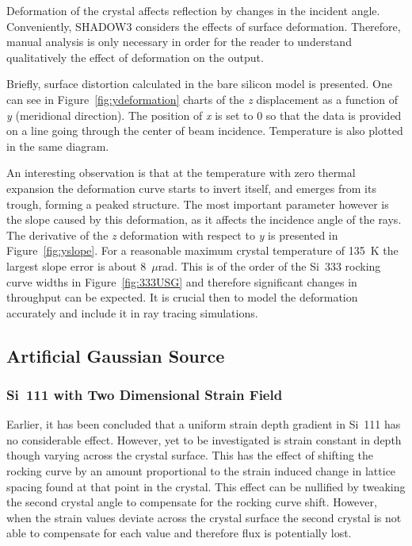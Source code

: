 \documentclass[preprint]{iucr}              %
\begin{document}
Deformation of the crystal affects reflection by changes in the incident angle. Conveniently, SHADOW3 considers the effects of surface deformation. Therefore, manual analysis is only necessary in order for the reader to understand qualitatively the effect of deformation on the output.

Briefly, surface distortion calculated in the bare silicon model is presented. One can see in Figure~\ref{fig:ydeformation} charts of the \textit{z} displacement as a function of \textit{y} (meridional direction). The position of \textit{x} is set to 0 so that the data is provided on a line going through the center of beam incidence. Temperature is also plotted in the same diagram.

An interesting observation is that at the temperature with zero thermal expansion the deformation curve starts to invert itself, and emerges from its trough, forming a peaked structure. The most important parameter however is the slope caused by this deformation, as it affects the incidence angle of the rays. The derivative of the \textit{z} deformation with respect to \textit{y} is presented in Figure~\ref{fig:yslope}. For a reasonable maximum crystal temperature of 135~K the largest slope error is about 8~$\mu$rad. This is of the order of the Si~333 rocking curve widths in Figure~\ref{fig:333USG} and therefore significant changes in throughput can be expected. It is crucial then to model the deformation accurately and include it in ray tracing simulations.

\subsection{Artificial Gaussian Source}\label{gaussian}
\subsubsection{Si~111 with Two Dimensional Strain Field}\label{111simulation}
Earlier, it has been concluded that a uniform strain depth gradient in Si~111 has no considerable effect. However, yet to be investigated is strain constant in depth though varying across the crystal surface. This has the effect of shifting the rocking curve by an amount proportional to the strain induced change in lattice spacing found at that point in the crystal. This effect can be nullified by tweaking the second crystal angle to compensate for the rocking curve shift. However, when the strain values deviate across the crystal surface the second crystal is not able to compensate for each value and therefore flux is potentially lost.
\end{document}
